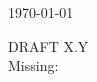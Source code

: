 \begin{titlepage}
	\vspace{0.5\baselineskip} %
	
	
	\vfill %
	
	
	
	\vspace{0.3\baselineskip} %
	
	\today %
	
	{DRAFT X.Y} %
	{\\Missing: }

\end{titlepage}


